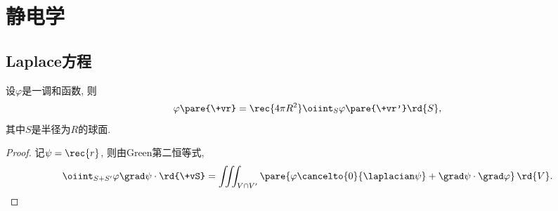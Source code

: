 \documentclass[hidelinks]{ctexart}
\begin{document}
\section{静电学} %
\label{sec:静电学}

\subsection{Laplace方程} %
\label{sub:laplace方程}

\begin{theorem}[平均值定理]
    设$\varphi$是一调和函数, 则
    \[ \varphi\pare{\+vr} = \rec{4\pi R^2}\oiint_S \varphi\pare{\+vr'}\rd{S}, \]
    其中$S$是半径为$R$的球面.
\end{theorem}
\begin{proof}
	记$\displaystyle \psi = \rec{r}$, 则由Green第二恒等式,
	\[ \oiint_{S+S'} \varphi\grad\psi\cdot\rd{\+vS} = \iiint_{V\cap V'} \pare{\varphi\cancelto{0}{\laplacian \psi} + \grad\psi\cdot\grad\varphi}\,\rd{V}. \]
\end{proof}


\end{document}
